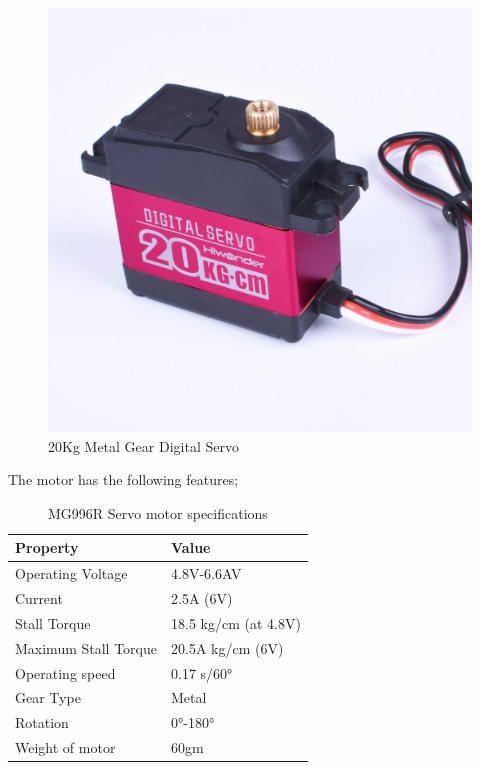 \begin{itemize}
\begin{figure}[H]
        \includegraphics [height=.3\textheight] {Figures/20kg servo.jpg}
        \caption{20Kg Metal Gear Digital Servo}
        \label{fig: 20Kg Metal Gear Digital Servo}
        \end{figure}
The motor has the following features;
\begin{table}[H]
    \centering
    \caption[MG996R Servo motor specifications]{MG996R Servo motor specifications \cite{mg996r}}
    \begin{tabular}{|l|l|}
    \hline
    \textbf{Property} & \textbf{Value} \\ \hline
    Operating Voltage & 4.8V-6.6AV \\ \hline
    Current & 2.5A (6V) \\ \hline
    Stall Torque & 18.5 kg/cm (at 4.8V) \\ \hline
    Maximum Stall Torque & 20.5A kg/cm (6V) \\ \hline
    Operating speed & 0.17 s/60° \\ \hline
    Gear Type & Metal \\ \hline
    Rotation & 0°-180° \\ \hline
    Weight of motor & 60gm \\ \hline
    \end{tabular}
    \label{tab:MG996R_servo_specs}
    \end{table}

\end{itemize}
